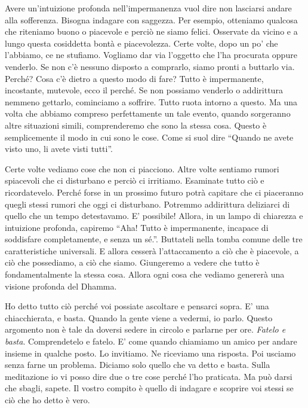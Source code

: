 Avere un'intuizione profonda nell'impermanenza vuol dire non lasciarsi
andare alla sofferenza. Bisogna indagare con saggezza. Per esempio,
otteniamo qualcosa che riteniamo buono o piacevole e perciò ne siamo
felici. Osservate da vicino e a lungo questa cosiddetta bontà e
piacevolezza. Certe volte, dopo un po' che l'abbiamo, ce ne stufiamo.
Vogliamo dar via l'oggetto che l'ha procurata oppure venderlo. Se non
c'è nessuno disposto a comprarlo, siamo pronti a buttarlo via. Perché?
Cosa c'è dietro a questo modo di fare? Tutto è impermanente, incostante,
mutevole, ecco il perché. Se non possiamo venderlo o addirittura nemmeno
gettarlo, cominciamo a soffrire. Tutto ruota intorno a questo. Ma una
volta che abbiamo compreso perfettamente un tale evento, quando
sorgeranno altre situazioni simili, comprenderemo che sono la stessa
cosa. Questo è semplicemente il modo in cui sono le cose. Come si suol
dire ``Quando ne avete visto uno, li avete visti tutti''.

Certe volte vediamo cose che non ci piacciono. Altre volte sentiamo
rumori spiacevoli che ci disturbano e perciò ci irritiamo. Esaminate
tutto ciò e ricordatevelo. Perché forse in un prossimo futuro potrà
capitare che ci piaceranno quegli stessi rumori che oggi ci disturbano.
Potremmo addirittura deliziarci di quello che un tempo detestavamo. E'
possibile! Allora, in un lampo di chiarezza e intuizione profonda,
capiremo ``Aha! Tutto è impermanente, incapace di soddisfare
completamente, e senza un sé.''. Buttateli nella tomba comune delle tre
caratteristiche universali. E allora cesserà l'attaccamento a ciò che è
piacevole, a ciò che possediamo, a ciò che siamo. Giungeremo a vedere
che tutto è fondamentalmente la stessa cosa. Allora ogni cosa che
vediamo genererà una visione profonda del Dhamma.

Ho detto tutto ciò perché voi possiate ascoltare e pensarci sopra. E'
una chiacchierata, e basta. Quando la gente viene a vedermi, io parlo.
Questo argomento non è tale da doversi sedere in circolo e parlarne per
ore. \emph{Fatelo e basta}. Comprendetelo e fatelo. E' come quando
chiamiamo un amico per andare insieme in qualche posto. Lo invitiamo. Ne
riceviamo una risposta. Poi usciamo senza farne un problema. Diciamo
solo quello che va detto e basta. Sulla meditazione io vi posso dire due
o tre cose perché l'ho praticata. Ma può darsi che sbagli, sapete. Il
vostro compito è quello di indagare e scoprire voi stessi se ciò che ho
detto è vero.

